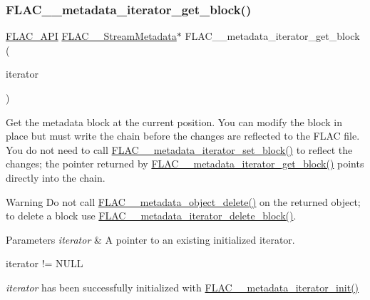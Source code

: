 \subsubsection{\texorpdfstring{F\+L\+A\+C\+\_\+\+\_\+metadata\+\_\+iterator\+\_\+get\+\_\+block()}{FLAC\_\_metadata\_iterator\_get\_block()}}
{\footnotesize\ttfamily \hyperlink{group__flac__export_ga56ca07df8a23310707732b1c0007d6f5}{F\+L\+A\+C\+\_\+\+A\+PI} \hyperlink{struct_f_l_a_c_____stream_metadata}{F\+L\+A\+C\+\_\+\+\_\+\+Stream\+Metadata}$\ast$ F\+L\+A\+C\+\_\+\+\_\+metadata\+\_\+iterator\+\_\+get\+\_\+block (\begin{DoxyParamCaption}\item[{\hyperlink{group__flac__metadata__level2_ga9f3e135a07cdef7e51597646aa7b89b2}{F\+L\+A\+C\+\_\+\+\_\+\+Metadata\+\_\+\+Iterator} $\ast$}]{iterator }\end{DoxyParamCaption})}

Get the metadata block at the current position. You can modify the block in place but must write the chain before the changes are reflected to the F\+L\+AC file. You do not need to call \hyperlink{group__flac__metadata__level2_gab40c33a0bf35a2932a5c13f5230e0d9e}{F\+L\+A\+C\+\_\+\+\_\+metadata\+\_\+iterator\+\_\+set\+\_\+block()} to reflect the changes; the pointer returned by \hyperlink{group__flac__metadata__level2_ga4a2b00a4312d178a9f55c2e2f8b08904}{F\+L\+A\+C\+\_\+\+\_\+metadata\+\_\+iterator\+\_\+get\+\_\+block()} points directly into the chain.

\begin{DoxyWarning}{Warning}
Do not call \hyperlink{group__flac__metadata__object_ga66bbe27dba68ba77be5af83986a280ea}{F\+L\+A\+C\+\_\+\+\_\+metadata\+\_\+object\+\_\+delete()} on the returned object; to delete a block use \hyperlink{group__flac__metadata__level2_ga18fdaae4986696dc000cae6357810f7b}{F\+L\+A\+C\+\_\+\+\_\+metadata\+\_\+iterator\+\_\+delete\+\_\+block()}.
\end{DoxyWarning}

\begin{DoxyParams}{Parameters}
{\em iterator} & A pointer to an existing initialized iterator.  
\begin{DoxyCode}
iterator != NULL 
\end{DoxyCode}
 {\itshape iterator} has been successfully initialized with \hyperlink{group__flac__metadata__level2_ga4a5af69a1f19436b02f738eb8c97c959}{F\+L\+A\+C\+\_\+\+\_\+metadata\+\_\+iterator\+\_\+init()} \\
\hline
\end{DoxyParams}

